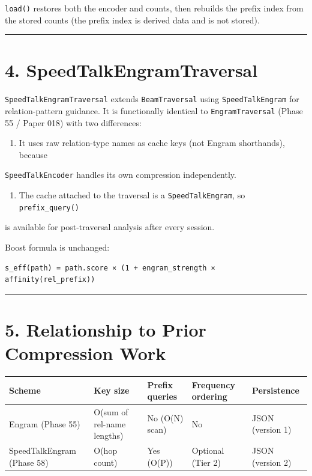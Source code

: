 \texttt{load()} restores both the encoder and counts, then rebuilds the prefix index from
the stored counts (the prefix index is derived data and is not stored).

\medskip\noindent\rule{\linewidth}{0.4pt}\medskip

\section*{4. SpeedTalkEngramTraversal}

\texttt{SpeedTalkEngramTraversal} extends \texttt{BeamTraversal} using \texttt{SpeedTalkEngram} for
relation-pattern guidance.  It is functionally identical to \texttt{EngramTraversal}
(Phase 55 / Paper 018) with two differences:

\begin{enumerate}
  \item It uses raw relation-type names as cache keys (not Engram shorthands), because
\end{enumerate}

\texttt{SpeedTalkEncoder} handles its own compression independently.
\begin{enumerate}
  \item The cache attached to the traversal is a \texttt{SpeedTalkEngram}, so \texttt{prefix\_query()}
\end{enumerate}

is available for post-traversal analysis after every session.

Boost formula is unchanged:

\begin{lstlisting}
s_eff(path) = path.score × (1 + engram_strength × affinity(rel_prefix))
\end{lstlisting}

\medskip\noindent\rule{\linewidth}{0.4pt}\medskip

\section*{5. Relationship to Prior Compression Work}

\begin{table}[h]
\small\centering
\begin{tabular}{lllll}
\toprule
Scheme & Key size & Prefix queries & Frequency ordering & Persistence \\
\midrule
Engram (Phase 55) & O(sum of rel-name lengths) & No (O(N) scan) & No & JSON (version 1) \\
SpeedTalkEngram (Phase 58) & O(hop count) & Yes (O(P)) & Optional (Tier 2) & JSON (version 2) \\
\bottomrule
\end{tabular}
\end{table}


